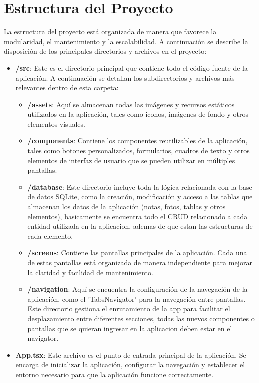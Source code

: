 \documentclass[a4paper,12pt]{article}
\begin{document}
\section{Estructura del Proyecto}

La estructura del proyecto está organizada de manera que favorece la modularidad, el mantenimiento y la escalabilidad. A continuación se describe la disposición de los principales directorios y archivos en el proyecto:

\begin{itemize}
    \item \textbf{/src}: Este es el directorio principal que contiene todo el código fuente de la aplicación. A continuación se detallan los subdirectorios y archivos más relevantes dentro de esta carpeta:
    \begin{itemize}
        \item \textbf{/assets}: Aquí se almacenan todas las imágenes y recursos estáticos utilizados en la aplicación, tales como iconos, imágenes de fondo y otros elementos visuales.
        \item \textbf{/components}: Contiene los componentes reutilizables de la aplicación, tales como botones personalizados, formularios, cuadros de texto y otros elementos de interfaz de usuario que se pueden utilizar en múltiples pantallas.
        \item \textbf{/database}: Este directorio incluye toda la lógica relacionada con la base de datos SQLite, como la creación, modificación y acceso a las tablas que almacenan los datos de la aplicación (notas, fotos, tablas y otros elementos), basicamente se encuentra todo el CRUD relacionado a cada entidad utilizada en la aplicacion, ademas de que estan las estructuras de cada elemento.
        \item \textbf{/screens}: Contiene las pantallas principales de la aplicación. Cada una de estas pantallas está organizada de manera independiente para mejorar la claridad y facilidad de mantenimiento.
        \item \textbf{/navigation}: Aquí se encuentra la configuración de la navegación de la aplicación, como el 'TabsNavigator' para la navegación entre pantallas. Este directorio gestiona el enrutamiento de la app para facilitar el desplazamiento entre diferentes secciones, todas las nuevos componentes o pantallas que se quieran ingresar en la aplicacion deben estar en el navigator.
    \end{itemize}
    \item \textbf{App.tsx}: Este archivo es el punto de entrada principal de la aplicación. Se encarga de inicializar la aplicación, configurar la navegación y establecer el entorno necesario para que la aplicación funcione correctamente.

\end{itemize}
\end{document}
